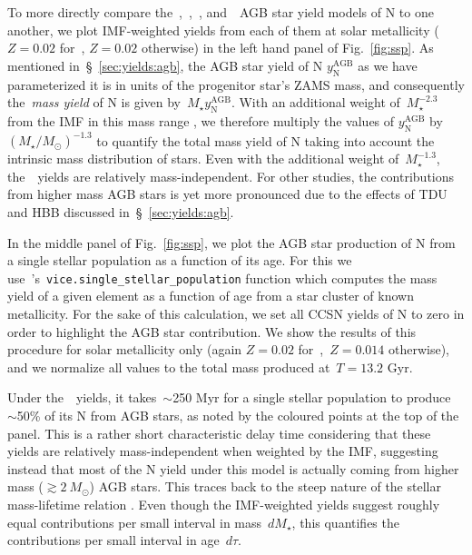 \documentclass[ms.tex]{subfiles}
\begin{document}
To more directly compare the~\karakasten,~\karakas,~\ventura,
and~\cristallo~AGB star yield models of N to one another, we plot IMF-weighted
yields from each of them at solar metallicity ($Z = 0.02$ for~\karakasten,
$Z = 0.02$ otherwise) in the left hand panel of Fig.~\ref{fig:ssp}.
As mentioned in~\S~\ref{sec:yields:agb}, the AGB star yield of N
$y_\text{N}^\text{AGB}$ as we have parameterized it is in units of the
progenitor star's ZAMS mass, and consequently the~\textit{mass yield} of N is
given by~$M_\star y_\text{N}^\text{AGB}$.
With an additional weight of~$M_\star^{-2.3}$ from the IMF in this mass range
\citep[e.g.][]{Kroupa2001}, we therefore multiply the values of
$y_\text{N}^\text{AGB}$ by~$(M_\star / M_\odot)^{-1.3}$ to quantify the total
mass yield of N taking into account the intrinsic mass distribution of stars.
Even with the additional weight of~$M_\star^{-1.3}$, the~\cristallo~yields are
relatively mass-independent.
For other studies, the contributions from higher mass AGB stars is yet more
pronounced due to the effects of TDU and HBB discussed
in~\S~\ref{sec:yields:agb}.
\par
In the middle panel of Fig.~\ref{fig:ssp}, we plot the AGB star production of
N from a single stellar population as a function of its age.
For this we use~\vice's~\texttt{vice.single\_stellar\_population} function
which computes the mass yield of a given element as a function of age from a
star cluster of known metallicity.
For the sake of this calculation, we set all CCSN yields of N to zero in order
to highlight the AGB star contribution.
We show the results of this procedure for solar metallicity only (again
$Z = 0.02$ for~\karakasten,~$Z = 0.014$ otherwise), and we normalize all values
to the total mass produced at~$T = 13.2$ Gyr.
\par
Under the~\cristallo~yields, it takes~$\sim$250 Myr for a single stellar
population to produce~$\sim$50\% of its N from AGB stars, as noted by the
coloured points at the top of the panel.
This is a rather short characteristic delay time considering that these yields
are relatively mass-independent when weighted by the IMF, suggesting
instead that most of the N yield under this model is actually coming from
higher mass ($\gtrsim 2~M_\odot$) AGB stars.
This traces back to the steep nature of the stellar mass-lifetime relation
\citep[e.g.][]{Larson1974, Maeder1989, Padovani1993}.
Even though the IMF-weighted yields suggest roughly equal contributions per
small interval in mass~$dM_\star$, this quantifies the contributions per small
interval in age~$d\tau$.
\end{document}
